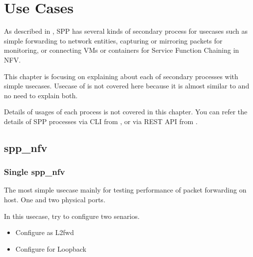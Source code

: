 \documentclass[a4paper,11pt,openany,oneside,english]{sphinxmanual}
\begin{document}
\chapter{Use Cases}
\label{\detokenize{usecases/index:use-cases}}\label{\detokenize{usecases/index:spp-usecases-index}}\label{\detokenize{usecases/index::doc}}
As described in {\hyperref[\detokenize{design/index:spp-design-index}]{}},
SPP has several kinds of secondary process for
usecases such as simple forwarding to network entities, capturing or
mirroring packets for monitoring, or connecting VMs or containers for
Service Function Chaining in NFV.

This chapter is focusing on explaining about each of secondary
processes with simple usecases.
Usecase of  is not covered here because it is almost
similar to  and no need to explain both.

Details of usages of each process is not covered in this chapter.
You can refer the details of SPP processes via CLI from
{\hyperref[\detokenize{commands/index:spp-commands-index}]{}},
or via REST API from {\hyperref[\detokenize{api_ref/index:spp-api-ref-index}]{}}.


\section{spp\_nfv}
\label{\detokenize{usecases/spp_nfv:spp-nfv}}\label{\detokenize{usecases/spp_nfv:spp-usecases-nfv}}\label{\detokenize{usecases/spp_nfv::doc}}

\subsection{Single spp\_nfv}
\label{\detokenize{usecases/spp_nfv:single-spp-nfv}}\label{\detokenize{usecases/spp_nfv:spp-usecases-nfv-single-spp-nfv}}
The most simple usecase mainly for testing performance of packet
forwarding on host.
One  and two physical ports.

In this usecase, try to configure two senarios.
\begin{itemize}
\item {} 
Configure  as L2fwd

\item {} 
Configure  for Loopback

\end{itemize}
\end{document}
